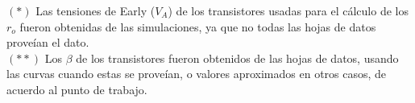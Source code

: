
\footnotesize{
$\left(*\right)$ Las tensiones de Early ($V_{A}$) de los transistores usadas para el cálculo de los $r_{o}$ fueron obtenidas de las simulaciones, ya que no todas las hojas de datos proveían el dato.\\
$\left(**\right)$ Los $\beta$ de los transistores fueron obtenidos de las hojas de datos, usando las curvas cuando estas se proveían, o valores aproximados en otros casos, de acuerdo al punto de trabajo.
}


\vfill









